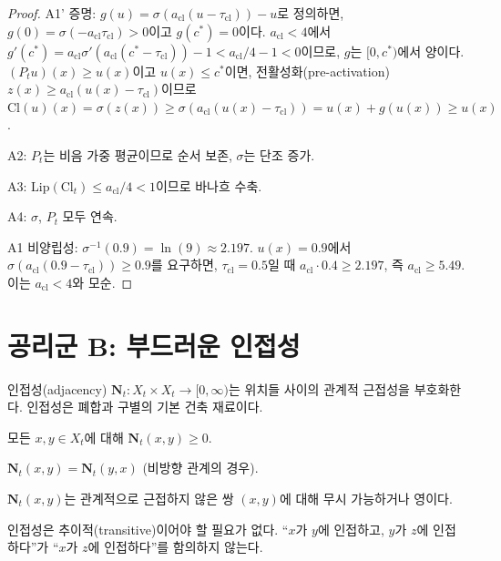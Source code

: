 \begin{proof}
A1' 증명: $g(u) = \sigma(a_{\mathrm{cl}}(u - \tau_{\mathrm{cl}})) - u$로 정의하면, $g(0) = \sigma(-a_{\mathrm{cl}}\tau_{\mathrm{cl}}) > 0$이고 $g(c^*) = 0$이다. $a_{\mathrm{cl}} < 4$에서 $g'(c^*) = a_{\mathrm{cl}}\sigma'(a_{\mathrm{cl}}(c^* - \tau_{\mathrm{cl}})) - 1 < a_{\mathrm{cl}}/4 - 1 < 0$이므로, $g$는 $[0, c^*)$에서 양이다. $(P_t u)(x) \geq u(x)$이고 $u(x) \leq c^*$이면, 전활성화(pre-activation) $z(x) \geq a_{\mathrm{cl}}(u(x) - \tau_{\mathrm{cl}})$이므로 $\mathrm{Cl}(u)(x) = \sigma(z(x)) \geq \sigma(a_{\mathrm{cl}}(u(x) - \tau_{\mathrm{cl}})) = u(x) + g(u(x)) \geq u(x)$.

A2: $P_t$는 비음 가중 평균이므로 순서 보존, $\sigma$는 단조 증가.

A3: $\text{Lip}(\mathrm{Cl}_t) \leq a_{\mathrm{cl}}/4 < 1$이므로 바나흐 수축.

A4: $\sigma$, $P_t$ 모두 연속.

A1 비양립성: $\sigma^{-1}(0.9) = \ln(9) \approx 2.197$. $u(x) = 0.9$에서 $\sigma(a_{\mathrm{cl}}(0.9 - \tau_{\mathrm{cl}})) \geq 0.9$를 요구하면, $\tau_{\mathrm{cl}} = 0.5$일 때 $a_{\mathrm{cl}} \cdot 0.4 \geq 2.197$, 즉 $a_{\mathrm{cl}} \geq 5.49$. 이는 $a_{\mathrm{cl}} < 4$와 모순.
\end{proof}


\section{공리군 B: 부드러운 인접성}
\label{sec:group-b}

인접성(adjacency) $\mathbf{N}_t : X_t \times X_t \to [0,\infty)$는 위치들 사이의 관계적 근접성을 부호화한다. 인접성은 폐합과 구별의 기본 건축 재료이다.

\begin{axiom}[B1: 비음성]
\label{ax:B1}
모든 $x, y \in X_t$에 대해 $\mathbf{N}_t(x,y) \geq 0$.
\end{axiom}

\begin{axiom}[B2: 대칭]
\label{ax:B2}
$\mathbf{N}_t(x,y) = \mathbf{N}_t(y,x)$ (비방향 관계의 경우).
\end{axiom}

\begin{axiom}[B3: 국소성]
\label{ax:B3}
$\mathbf{N}_t(x,y)$는 관계적으로 근접하지 않은 쌍 $(x,y)$에 대해 무시 가능하거나 영이다.
\end{axiom}

\begin{axiom}[B4: 비추이성]
\label{ax:B4}
인접성은 추이적(transitive)이어야 할 필요가 없다. ``$x$가 $y$에 인접하고, $y$가 $z$에 인접하다''가 ``$x$가 $z$에 인접하다''를 함의하지 않는다.
\end{axiom}

